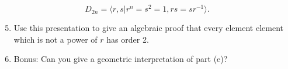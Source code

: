 \documentclass[11pt]{article}
\newcommand{\la}{\langle}
\newcommand{\ra}{\rangle}
\begin{document}
\begin{enumerate}
   \[D_{2n} = \la r,s | r^n = s^2 = 1, rs = sr^{-1}\ra.\]
   \begin{enumerate}
     \setcounter{enumii}{4}
     \item{
     Use this presentation to give an algebraic proof that every element element which is not a power of $r$ has order 2.
     }
     \item{
     Bonus: Can you give a geometric interpretation of part (e)?
     }
   \end{enumerate}
 \end{enumerate}
\end{document}
